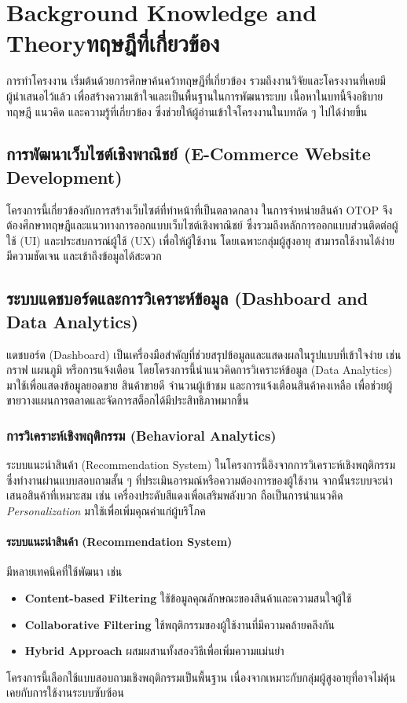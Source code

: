 \chapter{\ifenglish Background Knowledge and Theory\else ทฤษฎีที่เกี่ยวข้อง\fi}

การทำโครงงาน เริ่มต้นด้วยการศึกษาค้นคว้าทฤษฎีที่เกี่ยวข้อง 
รวมถึงงานวิจัยและโครงงานที่เคยมีผู้นำเสนอไว้แล้ว 
เพื่อสร้างความเข้าใจและเป็นพื้นฐานในการพัฒนาระบบ 
เนื้อหาในบทนี้จึงอธิบายทฤษฎี แนวคิด และความรู้ที่เกี่ยวข้อง \cite{pressman2014}
ซึ่งช่วยให้ผู้อ่านเข้าใจโครงงานในบทถัด ๆ ไปได้ง่ายขึ้น

\section{การพัฒนาเว็บไซต์เชิงพาณิชย์ (E-Commerce Website Development)}
โครงการนี้เกี่ยวข้องกับการสร้างเว็บไซต์ที่ทำหน้าที่เป็นตลาดกลาง 
ในการจำหน่ายสินค้า OTOP จึงต้องศึกษาทฤษฎีและแนวทางการออกแบบเว็บไซต์เชิงพาณิชย์ \cite{ecommerce2019} 
ซึ่งรวมถึงหลักการออกแบบส่วนติดต่อผู้ใช้ (UI) และประสบการณ์ผู้ใช้ (UX) \cite{pressman2014} 
เพื่อให้ผู้ใช้งาน โดยเฉพาะกลุ่มผู้สูงอายุ สามารถใช้งานได้ง่าย 
มีความชัดเจน และเข้าถึงข้อมูลได้สะดวก

\section{ระบบแดชบอร์ดและการวิเคราะห์ข้อมูล (Dashboard and Data Analytics)}
แดชบอร์ด (Dashboard) เป็นเครื่องมือสำคัญที่ช่วยสรุปข้อมูลและแสดงผลในรูปแบบที่เข้าใจง่าย \cite{ecommerce2019} 
เช่น กราฟ แผนภูมิ หรือการแจ้งเตือน โดยโครงการนี้นำแนวคิดการวิเคราะห์ข้อมูล (Data Analytics) \cite{otop2020} 
มาใช้เพื่อแสดงข้อมูลยอดขาย สินค้าขายดี จำนวนผู้เข้าชม และการแจ้งเตือนสินค้าคงเหลือ 
เพื่อช่วยผู้ขายวางแผนการตลาดและจัดการสต็อกได้มีประสิทธิภาพมากขึ้น

\subsection{การวิเคราะห์เชิงพฤติกรรม (Behavioral Analytics)}
ระบบแนะนำสินค้า (Recommendation System) ในโครงการนี้อิงจากการวิเคราะห์เชิงพฤติกรรม \cite{ecommerce2019} 
ซึ่งทำงานผ่านแบบสอบถามสั้น ๆ ที่ประเมินอารมณ์หรือความต้องการของผู้ใช้งาน 
จากนั้นระบบจะนำเสนอสินค้าที่เหมาะสม เช่น เครื่องประดับสีแดงเพื่อเสริมพลังบวก 
ถือเป็นการนำแนวคิด \textit{Personalization} มาใช้เพื่อเพิ่มคุณค่าแก่ผู้บริโภค

\subsubsection{ระบบแนะนำสินค้า (Recommendation System)}
มีหลายเทคนิคที่ใช้พัฒนา เช่น
\begin{itemize}
    \item \textbf{Content-based Filtering} ใช้ข้อมูลคุณลักษณะของสินค้าและความสนใจผู้ใช้
    \item \textbf{Collaborative Filtering} ใช้พฤติกรรมของผู้ใช้งานที่มีความคล้ายคลึงกัน
    \item \textbf{Hybrid Approach} ผสมผสานทั้งสองวิธีเพื่อเพิ่มความแม่นยำ
\end{itemize}
โครงการนี้เลือกใช้แบบสอบถามเชิงพฤติกรรมเป็นพื้นฐาน \cite{ecommerce2019} 
เนื่องจากเหมาะกับกลุ่มผู้สูงอายุที่อาจไม่คุ้นเคยกับการใช้งานระบบซับซ้อน

